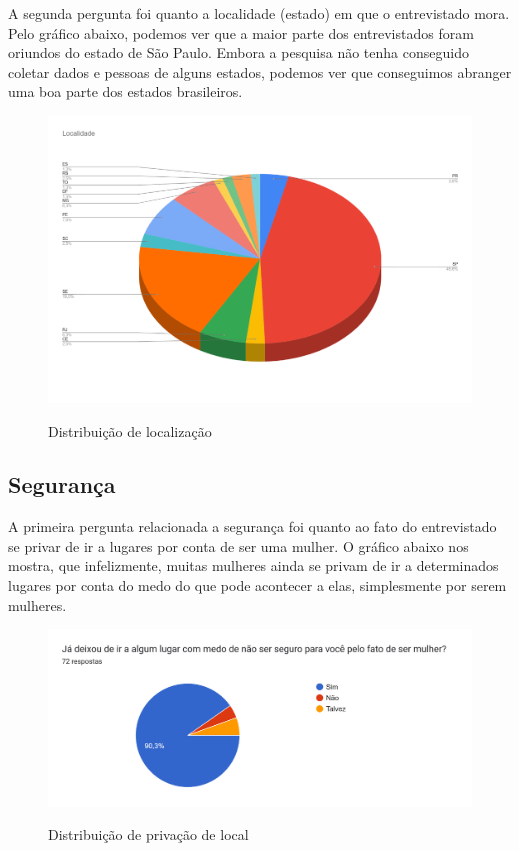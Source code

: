 A segunda pergunta foi quanto a localidade (estado) em que o entrevistado mora. Pelo gráfico abaixo, podemos ver que a maior parte dos entrevistados foram oriundos do estado de São Paulo. Embora a pesquisa não tenha conseguido coletar dados e pessoas de alguns estados, podemos ver que conseguimos abranger uma boa parte dos estados brasileiros.
\begin{figure}[H]
  \begin{center}
  \includegraphics[width=0.6\linewidth]{images/distribuicao-estados.png}\\
  \end{center}
  \caption[Distribuição de localização]{Distribuição de localização}
  \label{fig:mapa-empatia=inicial}
\end{figure}

\subsection{Segurança}
A primeira pergunta relacionada a segurança foi quanto ao fato do entrevistado se privar de ir a lugares por conta de ser uma mulher. O gráfico abaixo nos mostra, que infelizmente, muitas mulheres ainda se privam de ir a determinados lugares por conta do medo do que pode acontecer a elas, simplesmente por serem mulheres. 
\begin{figure}[H]
  \begin{center}
  \includegraphics[width=1.0\linewidth]{images/distribuicao-privacao-mulher.png}\\
  \end{center}
  \caption[Distribuição de privação de local]{Distribuição de privação de local}
  \label{fig:mapa-empatia=inicial}
\end{figure}

